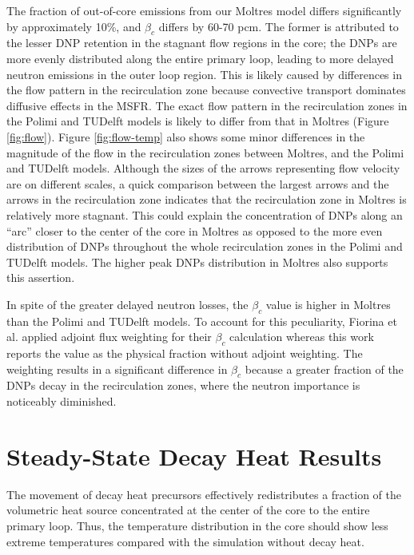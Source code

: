The fraction of out-of-core emissions from our Moltres model
differs significantly by approximately 10\%, and $\beta_c$ differs by
60-70 pcm. The former is attributed to the lesser \gls{DNP} retention in the
stagnant flow regions in the core; the \glspl{DNP} are more evenly distributed
along the entire primary loop, leading to more delayed neutron emissions in
the outer loop region. This is likely caused by differences in the
flow pattern in the recirculation zone because convective transport
dominates diffusive effects in the \gls{MSFR}. The exact flow pattern in the
recirculation zones in the Polimi and TUDelft models is likely to differ from
that in Moltres (Figure \ref{fig:flow}). Figure \ref{fig:flow-temp} also shows
some minor differences in the magnitude of the flow in the recirculation zones
between Moltres, and the Polimi and TUDelft models. Although the sizes of the
arrows representing flow velocity are on different scales, a
quick comparison between the largest arrows and the arrows in the
recirculation zone indicates that the recirculation zone in Moltres is
relatively more stagnant. This could explain the concentration of \glspl{DNP}
along an ``arc'' closer to the center of the core in Moltres as opposed to the
more even distribution of \glspl{DNP} throughout the whole recirculation zones
in the Polimi and TUDelft models. The higher peak \glspl{DNP} distribution in
Moltres also supports this assertion.

In spite of the greater delayed neutron losses, the $\beta_c$ value is higher
in Moltres than the Polimi and TUDelft models. To account for this
peculiarity, Fiorina et al. \cite{fiorina_modelling_2014} applied adjoint flux
weighting for their $\beta_c$ calculation whereas this work
reports the value as the physical fraction without adjoint weighting. The
weighting results in a significant difference in $\beta_c$ because a greater
fraction of the \glspl{DNP} decay in the recirculation zones, where the
neutron importance is noticeably diminished.

\section{Steady-State Decay Heat Results}

The movement of decay heat precursors effectively redistributes a fraction of
the volumetric heat source concentrated at the center of the core to the
entire primary loop.
Thus, the temperature distribution in the core should
show less extreme temperatures compared with the simulation without decay
heat.

